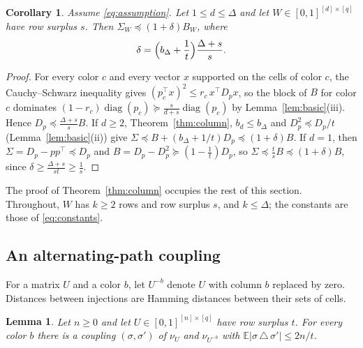 \documentclass{amsart}
\numberwithin{equation}{section}
\theoremstyle{plain}
\newtheorem{lemma}[theorem]{Lemma}
\newtheorem{corollary}[theorem]{Corollary}
\theoremstyle{definition}
\theoremstyle{remark}
\newcommand{\E}{\mathbb{E}}
\newcommand{\diag}{\operatorname{diag}}
\newcommand{\T}{\top}
\begin{document}
\begin{corollary}\label{cor:column}
Assume \eqref{eq:assumption}. Let $1\le d\le\Delta$ and let $W\in[0,1]^{[d]\times[q]}$ have row surplus $s$. Then $\Sigma_W\preceq(1+\delta)B_W$, where
\[
\delta=\Bigl(b_\Delta+\frac1t\Bigr)\frac{\Delta+s}{s}.
\]
\end{corollary}

\begin{proof}
For every color $c$ and every vector $x$ supported on the cells of color $c$, the Cauchy--Schwarz inequality gives $(p_c^\T x)^2\le r_c\,x^\T D_px$, so the block of $B$ for color $c$ dominates $(1-r_c)\diag(p_c)\succeq\frac{s}{d+s}\diag(p_c)$ by Lemma~\ref{lem:basic}(iii). Hence $D_p\preceq\frac{\Delta+s}{s}B$. If $d\ge2$, Theorem~\ref{thm:column}, $b_d\le b_\Delta$ and $D_p^2\preceq D_p/t$ (Lemma~\ref{lem:basic}(ii)) give $\Sigma\preceq B+(b_\Delta+1/t)D_p\preceq(1+\delta)B$. If $d=1$, then $\Sigma=D_p-pp^\T\preceq D_p$ and $B=D_p-D_p^2\succeq(1-\frac1t)D_p$, so $\Sigma\preceq\frac ts B\preceq(1+\delta)B$, since $\delta\ge\frac{\Delta+s}{st}\ge\frac1s$.
\end{proof}

The proof of Theorem~\ref{thm:column} occupies the rest of this section. Throughout, $W$ has $k\ge2$ rows and row surplus $s$, and $k\le\Delta$; the constants are those of \eqref{eq:constants}.

\subsection{An alternating-path coupling}
For a matrix $U$ and a color $b$, let $U^{-b}$ denote $U$ with column $b$ replaced by zero. Distances between injections are Hamming distances between their sets of cells.

\begin{lemma}\label{lem:coupling}
Let $n\ge0$ and let $U\in[0,1]^{[n]\times[q]}$ have row surplus $t$. For every color $b$ there is a coupling $(\sigma,\sigma')$ of $\nu_U$ and $\nu_{U^{-b}}$ with $\E|\sigma\,\triangle\,\sigma'|\le2n/t$.
\end{lemma}
\end{document}
